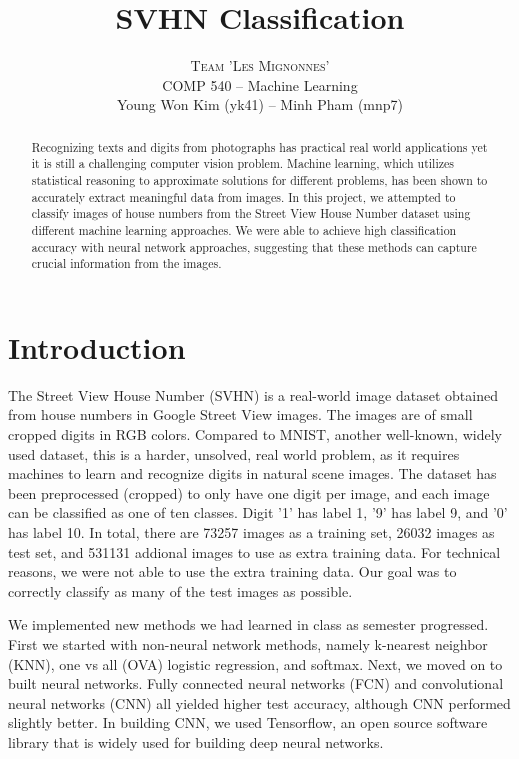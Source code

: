 \documentclass[12pt]{article}
\title{\vspace{-15mm}\fontsize{24pt}{10pt}\selectfont\textbf{SVHN Classification}} %
\author{
	\large
	\textsc{Team 'Les Mignonnes'}\\[2mm] %
	\normalsize COMP 540 -- Machine Learning \\ %
	\normalsize Young Won Kim (yk41) -- Minh Pham (mnp7) %
	\vspace{-5mm}
}
\begin{document}
\maketitle

\hrulefill

\begin{abstract}
	\noindent Recognizing texts and digits from photographs has practical real world applications yet it is still a challenging computer vision problem. Machine learning, which utilizes statistical reasoning to approximate solutions for different problems, has been shown to accurately extract meaningful data from images. In this project, we attempted to classify images of house numbers from the Street View House Number dataset using different machine learning approaches. We were able to achieve high classification accuracy with neural network approaches, suggesting that these methods can capture crucial information from the images. 
\end{abstract}

\hrulefill

\section{Introduction}
\indent The Street View House Number (SVHN) is a real-world image dataset obtained from house numbers in Google Street View images. The images are of small cropped digits in RGB colors. Compared to MNIST, another well-known, widely used dataset, this is a harder, unsolved, real world problem, as it requires machines to learn and recognize digits in natural scene images. The dataset has been preprocessed (cropped) to only have one digit per image, and each image can be classified as one of ten classes. Digit '1' has label 1, '9' has label 9, and '0' has label 10. In total, there are 73257 images as a training set, 26032 images as test set, and 531131 addional images to use as extra training data. For technical reasons, we were not able to use the extra training data. Our goal was to correctly classify as many of the test images as possible. 

\indent We implemented new methods we had learned in class as semester progressed. First we started with non-neural network methods, namely k-nearest neighbor (KNN), one vs all (OVA) logistic regression, and softmax. Next, we moved on to built neural networks. Fully connected neural networks (FCN) and convolutional neural networks (CNN) all yielded higher test accuracy, although CNN performed slightly better. In building CNN, we used Tensorflow, an open source software library that is widely used for building deep neural networks. 
\end{document}
